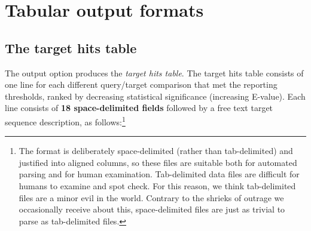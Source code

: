 \section{Tabular output formats}
\label{section:tabular}
\setcounter{footnote}{0}

\subsection{The target hits table}

The  output option produces the \emph{target hits
  table}.  The target hits table consists of one line for each
different query/target comparison that met the reporting thresholds,
ranked by decreasing statistical significance (increasing E-value).
Each line consists of \textbf{18 space-delimited fields} followed by a
free text target sequence description, as follows:\footnote{The
   format is deliberately space-delimited (rather than
  tab-delimited) and justified into aligned columns, so these files
  are suitable both for automated parsing and for human
  examination. Tab-delimited data files are difficult for humans to
  examine and spot check. For this reason, we think tab-delimited
  files are a minor evil in the world. Contrary to the shrieks of
  outrage we occasionally receive about this, space-delimited files
  are just as trivial to parse as tab-delimited files.}

